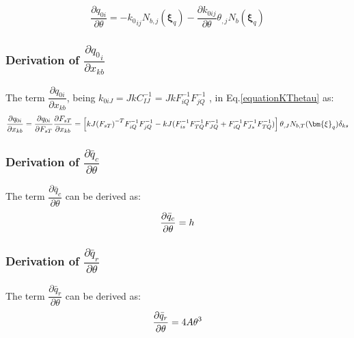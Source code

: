 \documentclass[oneside,11pt,times]{book}
\begin{document}

\begin{equation}
    \begin{aligned}
      \dfrac{\partial q_{0i}}{\partial\theta}=- {k_0}_{ij}N_{b,j}(\bm{\xi}_q)-\dfrac{\partial k_{0ij}}{\partial\theta}\theta_{,j}N_b(\bm{\xi}_q)
    \end{aligned}
\end{equation}

\subsubsection{Derivation of $\dfrac{\partial{{q_0}_i}}{\partial{x_{kb}}}$}

The term $\dfrac{\partial{q_{0i}}}{\partial{x_{kb}}}$, being $k_{0iJ}=JkC_{IJ}^{-1}=JkF_{iQ}^{-1}F_{jQ}^{-1}$ , in Eq.\eqref{equationKThetau} as:
\begin{equation}
\begin{aligned}
\centering
\dfrac{\partial{q_{0i}}}{\partial{x_{kb}}}=\dfrac{\partial{q_{0i}}}{\partial{F_{sT}}}\dfrac{\partial{{F_{sT}}}}{\partial{x_{kb}}}=\left[kJ{(F_{sT})}^{-T}F_{iQ}^{-1}F_{jQ}^{-1}-kJ(F_{is}^{-1}F_{TQ}^{-1}F_{JQ}^{-1}+F_{iQ}^{-1}F_{Js}^{-1}F_{TQ}^{-1}
)\right]\theta_{,J}N_{b,T}(\bm{\xi}_q)\delta_{ks}
\end{aligned}
\label{equationdPhiTimedPhi}
\end{equation}

\subsubsection{Derivation of $\dfrac{\partial{\bar{q}_c}}{\partial{\theta}}$}
The term $\dfrac{\partial{\bar{q}_c}}{\partial{\theta}}$
can be derived as:
\begin{equation}
\begin{aligned}
\centering
\dfrac{\partial{\bar{q}_c}}{\partial{\theta}}=h
\end{aligned}
\end{equation}

\subsubsection{Derivation of $\dfrac{\partial{\bar{q}_r}}{\partial{\theta}}$}
The term $\dfrac{\partial{\bar{q}_r}}{\partial{\theta}}$
can be derived as:
\begin{equation}
\begin{aligned}
\centering
\dfrac{\partial{\bar{q}_r}}{\partial{\theta}}=4A{\theta}^3
\end{aligned}
\end{equation}
\end{document}
